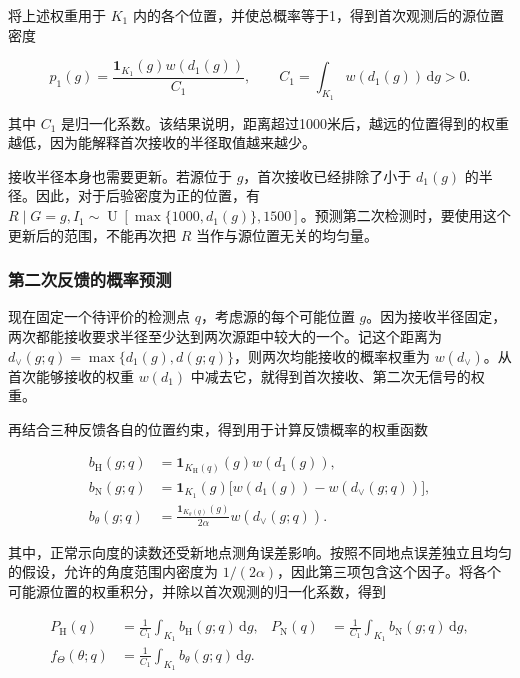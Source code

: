 将上述权重用于 \(K_1\) 内的各个位置，并使总概率等于1，得到首次观测后的源位置密度

\begin{equation}
 p_1(g)=\frac{\mathbf1_{K_1}(g)w(d_1(g))}{C_1},
 \qquad C_1=\int_{K_1}w(d_1(g))\,\mathrm dg>0.
\label{eq:q2-pair-posterior}
\end{equation}

其中 \(C_1\) 是归一化系数。该结果说明，距离超过1000米后，越远的位置得到的权重越低，因为能解释首次接收的半径取值越来越少。

接收半径本身也需要更新。若源位于 \(g\)，首次接收已经排除了小于 \(d_1(g)\) 的半径。因此，对于后验密度为正的位置，有 \(R\mid G=g,I_1\sim\operatorname{U}[\max\{1000,d_1(g)\},1500]\)。预测第二次检测时，要使用这个更新后的范围，不能再次把 \(R\) 当作与源位置无关的均匀量。

\subsubsection{第二次反馈的概率预测}

现在固定一个待评价的检测点 \(q\)，考虑源的每个可能位置 \(g\)。因为接收半径固定，两次都能接收要求半径至少达到两次源距中较大的一个。记这个距离为 \(d_\vee(g;q)=\max\{d_1(g),d(g;q)\}\)，则两次均能接收的概率权重为 \(w(d_\vee)\)。从首次能够接收的权重 \(w(d_1)\) 中减去它，就得到首次接收、第二次无信号的权重。

再结合三种反馈各自的位置约束，得到用于计算反馈概率的权重函数

\begin{equation}
\begin{aligned}
 b_{\mathrm H}(g;q)&=\mathbf1_{K_{\mathrm H}(q)}(g)w(d_1(g)),\\
 b_{\mathrm N}(g;q)&=\mathbf1_{K_1}(g)\bigl[w(d_1(g))-w(d_\vee(g;q))\bigr],\\
 b_\theta(g;q)&=\frac{\mathbf1_{K_\theta(q)}(g)}{2\alpha}w(d_\vee(g;q)).
\end{aligned}
\label{eq:q2-pair-feedback-weights}
\end{equation}

其中，正常示向度的读数还受新地点测角误差影响。按照不同地点误差独立且均匀的假设，允许的角度范围内密度为 \(1/(2\alpha)\)，因此第三项包含这个因子。将各个可能源位置的权重积分，并除以首次观测的归一化系数，得到

\begin{equation}
\begin{aligned}
 P_{\mathrm H}(q)&=\frac{1}{C_1}\int_{K_1}b_{\mathrm H}(g;q)\,\mathrm dg,
 &P_{\mathrm N}(q)&=\frac{1}{C_1}\int_{K_1}b_{\mathrm N}(g;q)\,\mathrm dg,\\
 f_\Theta(\theta;q)&=\frac{1}{C_1}\int_{K_1}b_\theta(g;q)\,\mathrm dg.
\end{aligned}
\label{eq:q2-pair-prediction}
\end{equation}

